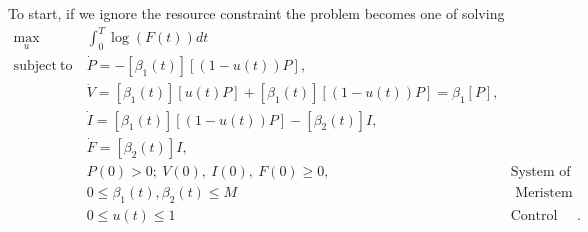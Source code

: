 \documentclass[12pt, oneside]{article}   	%
\begin{document}
To start, if we ignore the resource constraint the problem becomes one of solving 
%
\begin{align}
\max_{u} &  \int_0^T  \log( F(t) ) dt  \nonumber \\
\mathrm{subject\ to\ } 
& \dot{P} = - [\beta_1(t)] [(1 - u(t)) P ] , \nonumber \\
& \dot{V} = [\beta_1(t)] [ u(t) P]  + [\beta_1(t)] [(1 - u(t)) P] = \beta_1 [P] , \nonumber \\ 
& \dot{I} = [\beta_1(t)] [( 1-u(t) ) P] - [\beta_2(t)] I, \nonumber \\ 
& \dot{F} = [\beta_2(t)] I , \nonumber \\ 
& P(0) > 0;\ V(0),\ I(0),\ F(0) \geq 0, & \mbox{System of ODEs, initial conditions}  \nonumber \\
& 0 \le \beta_1(t), \beta_2(t) \le M & \mbox{ Meristem constraint}  \nonumber \\
& 0 \leq u(t) \leq 1 & \mbox{Control constraint} \nonumber.  
\end{align}
\end{document}
